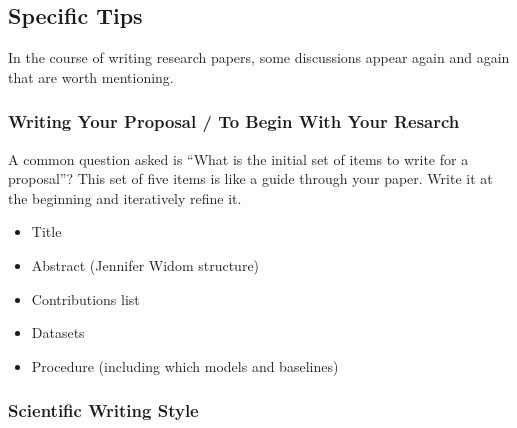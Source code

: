 \documentclass[manuscript, nonacm]{acmart}
\begin{document}
\subsection{Specific Tips}

In the course of writing research papers, some discussions appear again and again that are worth mentioning.

\subsubsection{Writing Your Proposal / To Begin With Your Resarch}

A common question asked is ``What is the initial set of items to write for a proposal''?
This set of five items is like a guide through your paper.
Write it at the beginning and iteratively refine it.

\begin{itemize}
\item Title
\item Abstract (Jennifer Widom structure)
\item Contributions list
\item Datasets
\item Procedure (including which models and baselines)
\end{itemize}


\subsubsection{Scientific Writing Style}
\end{document}
